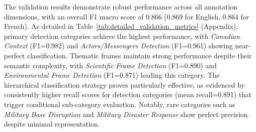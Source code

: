 \documentclass[12pt]{article}
\begin{document}
The validation results demonstrate robust performance across all annotation dimensions, with an overall F1 macro score of 0.866 (0.869 for English, 0.864 for French). As detailed in Table~\ref{tab:detailed_validation_metrics} (Appendix), primary detection categories achieve the highest performance, with \textit{Canadian Context} (F1=0.982) and \textit{Actors/Messengers Detection} (F1=0.961) showing near-perfect classification. Thematic frames maintain strong performance despite their semantic complexity, with \textit{Scientific Frame Detection} (F1=0.890) and \textit{Environmental Frame Detection} (F1=0.871) leading this category. The hierarchical classification strategy proves particularly effective, as evidenced by consistently higher recall scores for detection categories (mean recall=0.891) that trigger conditional sub-category evaluation. Notably, rare categories such as \textit{Military Base Disruption} and \textit{Military Disaster Response} show perfect precision despite minimal representation.
\end{document}
